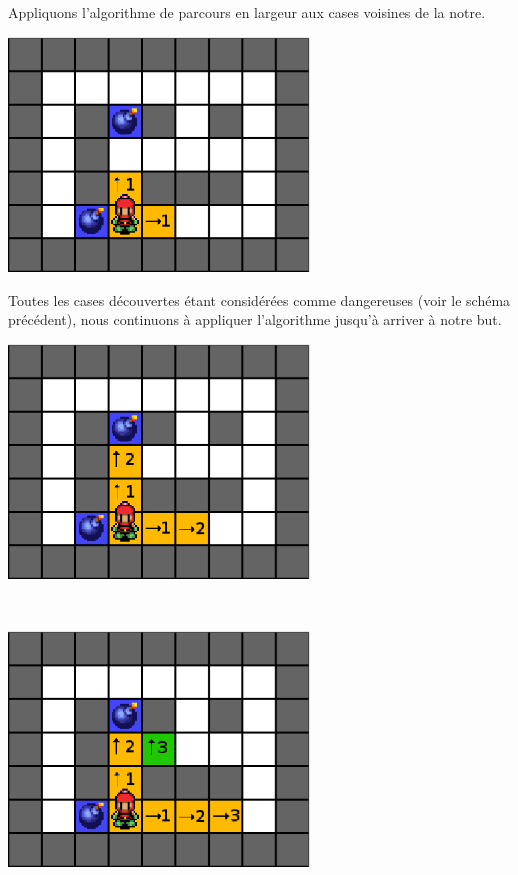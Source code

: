			Appliquons l'algorithme de parcours en largeur aux cases voisines de la notre.
			
			
			\begin{center}
				\includegraphics[width=8cm]{./Analyse/Img/largeur_2.eps}
			\end{center}
			
			
			Toutes les cases découvertes étant considérées comme dangereuses (voir le schéma précédent), nous continuons à appliquer l'\gls{algorithme} jusqu'à arriver à notre but.
			
			\begin{center}
				\includegraphics[width=8cm]{./Analyse/Img/largeur_3.eps}
				
				$\,$
				
				\includegraphics[width=8cm]{./Analyse/Img/largeur_4.eps}
			\end{center}
			
